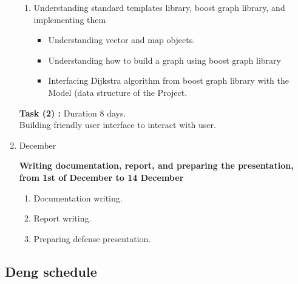 \documentclass[a4paper, 12pt, english]{book}
\begin{document}
\begin{enumerate}
\begin{enumerate}
\item {Understanding standard templates library, boost graph library, and implementing them}
\begin{itemize}
    \item {Understanding vector and map objects.}
    \item {Understanding how to build a graph using boost graph library}
    \item {Interfacing Dijkstra algorithm from boost graph library  with the Model (data structure of the Project.\\} 
\end{itemize}
\end{enumerate}
\textbf{Task (2) :} Duration 8 days.\\
Building friendly user interface to interact with user.

\item {{\Large December\par}}
\textbf{Writing documentation, report, and preparing the presentation, from 1st of December to 14 December}
\begin{enumerate}

\item {Documentation writing.}
\item {Report writing.}
\item {Preparing defense presentation.}

\end{enumerate}

\end{enumerate}
\subsection{Deng schedule}





\end{document}
